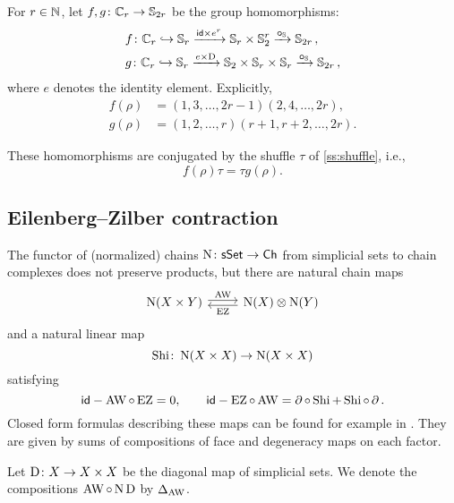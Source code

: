 For $r \in \mathbb{N}$, let $f,g \colon \mathbb{C}_r \to \mathbb{S}_{2r}$ be the group homomorphisms:
\[
\begin{split}
	&f \colon \mathbb{C}_r \hookrightarrow \mathbb{S}_r \xrightarrow{\mathsf{id} \times e^r} \mathbb{S}_r \times \mathbb{S}_2^r \xrightarrow{\bm{\circ}_{\mathbb{S}}} \mathbb{S}_{2r}\,, \\
	&g \colon \mathbb{C}_r \hookrightarrow \mathbb{S}_r \xrightarrow{e \times \mathrm{D}} \mathbb{S}_2 \times \mathbb{S}_r \times \mathbb{S}_r \xrightarrow{\bm{\circ}_{\mathbb{S}}} \mathbb{S}_{2r}\,,
\end{split}
\]
where $e$ denotes the identity element.
Explicitly,
\begin{align*}
	f(\rho) &= (1,3,\dots,2r-1)(2,4,\dots,2r), \\
	g(\rho) &= (1,2,\dots,r)(r+1,r+2,\dots,2r).
\end{align*}

\begin{lemma}
	These homomorphisms are conjugated by the shuffle $\tau$ of \cref{ss:shuffle}, i.e.,
	\[
	f(\rho) \tau = \tau g(\rho).
	\]
\end{lemma}

\subsection{Eilenberg--Zilber contraction}

The functor of (normalized) chains $\operatorname{N} \colon \mathsf{sSet} \to \mathsf{Ch}$ from simplicial sets to chain complexes does not preserve products, but there are natural chain maps
\[
\begin{tikzcd}
	\chains(X \times Y) \arrow[r,shift left=2pt,"\AW"] &
	\chains(X) \ot \chains(Y) \arrow[l,shift left=2pt,"\EZ"]
\end{tikzcd}
\]
and a natural linear map
\[
\operatorname{Shi} \colon \operatorname{N}(X \times X) \to \operatorname{N}(X \times X)
\]
satisfying
\[
\mathsf{id} - \operatorname{AW} \circ \operatorname{EZ} = 0, \qquad
\mathsf{id} - \operatorname{EZ} \circ \operatorname{AW} = \operatorname{\partial} \circ \operatorname{Shi} + \operatorname{Shi} \circ \operatorname{\partial}.
\]
Closed form formulas describing these maps can be found for example in \cite[56]{real2000homological}.
They are given by sums of compositions of face and degeneracy maps on each factor.

Let $\mathrm{D} \colon X \to X \times X$ be the diagonal map of simplicial sets.
We denote the compositions $\operatorname{AW} \circ \operatorname{N}\mathrm{D}$ by $\Delta_{\operatorname{AW}}$.